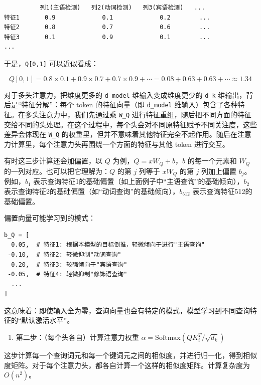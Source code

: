 \begin{verbatim}
          列1(主语检测)   列2(动词检测)   列3(宾语检测)   ...
特征1       0.9             0.1             0.2        ...
特征2       0.8             0.7             0.6        ...
特征3       0.1             0.9             0.1        ...
...
\end{verbatim}

于是，\texttt{Q{[}0,1{]}} 可以近似看成：

\[
Q[0,1] = 0.8 \times 0.1 + 0.9 \times 0.7 + 0.7 \times 0.9 + \cdots = 0.08 + 0.63 + 0.63 + \cdots \approx 1.34
\]

对于多头注意力，把维度更多的 \texttt{d\_model} 维输入变成维度更少的 \texttt{d\_k} 维输出，背后是``特征分解''：每个 token 的特征向量（即 \texttt{d\_model} 维输入）包含了各种特征。在多头注意力中，我们先通过乘 \texttt{W\_Q} 进行特征重组，随后把不同方面的特征交给不同的头处理。在这个过程中，每个头会对不同原特征赋予不同关注度，这些差异会体现在 \texttt{W\_Q} 的权重里，但并不意味着其他特征完全不起作用。随后在注意力计算里，每个注意力头再围绕一个方面的特征与其他 token 进行交互。

有时这三步计算还会加偏置，以 \(Q\) 为例，\(Q=xW_Q+b\)，\(b\) 的每一个元素和 \(W_Q\) 的一列对应。也可以把它理解为：\(Q\) 的第 \(j\) 列等于 \(xW_Q\) 的第 \(j\) 列加上偏置 \(b_j\)。例如，\(b_1\) 表示查询特征1的基础偏置（如上面例子中``主语查询''的基础倾向），\(b_2\) 表示查询特征2的基础偏置（如``动词查询''的基础倾向），\(b_{512}\) 表示查询特征512的基础偏置。

偏置向量可能学习到的模式：

\begin{verbatim}
b_Q = [
  0.05,  # 特征1: 根据本模型的目标倒推，轻微倾向于进行"主语查询"
 -0.10,  # 特征2: 轻微抑制"动词查询"
  0.20,  # 特征3: 较强倾向于"宾语查询"
 -0.05,  # 特征4: 轻微抑制"修饰语查询"
  ...
]
\end{verbatim}

这意味着：即使输入全为零，查询向量也会有特定的模式，模型学习到不同查询特征的``默认激活水平''。

\begin{enumerate}
\def\labelenumi{\arabic{enumi}.}
\setcounter{enumi}{1}
\tightlist
\item
  第二步：（每个头各自）计算注意力权重 \(\alpha=\mathrm{Softmax}\left(QK_i^T/\sqrt{d_k}\right)\)
\end{enumerate}

这步计算每一个查询词元和每一个键词元之间的相似度，并进行归一化，得到相似度矩阵。对于每个注意力头，都各自计算一个这样的相似度矩阵。计算复杂度为 \(O(n^2)\)。

